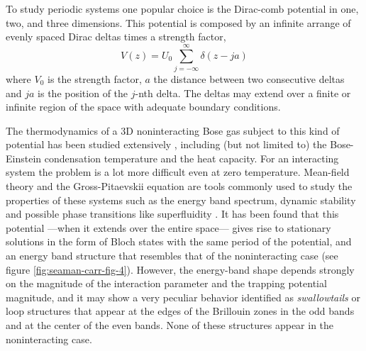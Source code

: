 To study periodic systems one popular choice is the Dirac-comb potential in one,
two, and three dimensions. This potential is composed by an infinite arrange of
evenly spaced Dirac deltas times a strength factor,
%
\begin{equation}
  \label{eq:dirac-comb-potential}
  V(z) = U_0 \sum_{j=-\infty}^{\infty} \delta(z - j a)
\end{equation}
%
where $V_0$ is the strength factor, $a$ the distance between two consecutive
deltas and $j a$ is the position of the $j$-nth delta. The deltas may extend
over a finite or infinite region of the space with adequate boundary conditions.

The thermodynamics of a 3D noninteracting Bose gas subject to this kind of
potential has been studied extensively
\cite{bib:p-salas-phys-rev-A.82.033632.2010,
  bib:salas-j-low-temp-phys.159.5.2010}, including (but not limited to) the
Bose-Einstein condensation temperature and the heat capacity. For an interacting
system the problem is a lot more difficult even at zero temperature. Mean-field
theory and the Gross-Pitaevskii equation are tools commonly used to study the
properties of these systems such as the energy band spectrum, dynamic stability
and possible phase transitions like superfluidity
\cite{bib:seaman-phys-rev-A.71.033622.2005, bib:dong-laser-physics.17.2.2007}.
It has been found that this potential ---when it extends over the entire
space--- gives rise to stationary solutions in the form of Bloch states with the
same period of the potential, and an energy band structure that resembles that
of the noninteracting case (see figure \ref{fig:seaman-carr-fig-4}). However,
the energy-band shape depends strongly on the magnitude of the interaction
parameter and the trapping potential magnitude, and it may show a very peculiar
behavior identified as \textit{swallowtails} or loop structures that appear at
the edges of the Brillouin zones in the odd bands and at the center of the even
bands. None of these structures appear in the noninteracting case.

